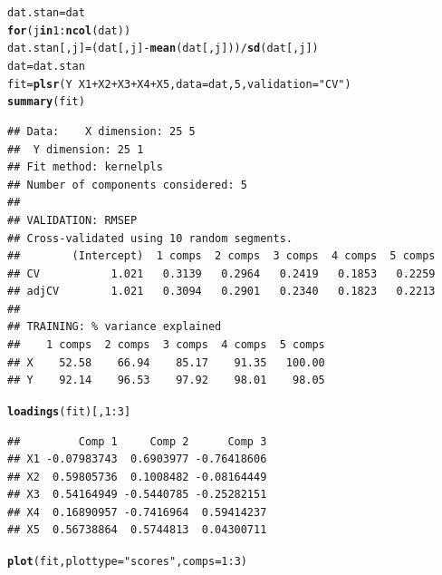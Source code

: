 \documentclass{article}\usepackage[]{graphicx}\usepackage[]{color}
\makeatletter
\newcommand{\hlnum}[1]{\textcolor[rgb]{0.686,0.059,0.569}{#1}}%
\newcommand{\hlstr}[1]{\textcolor[rgb]{0.192,0.494,0.8}{#1}}%
\newcommand{\hlopt}[1]{\textcolor[rgb]{0,0,0}{#1}}%
\newcommand{\hlstd}[1]{\textcolor[rgb]{0.345,0.345,0.345}{#1}}%
\newcommand{\hlkwa}[1]{\textcolor[rgb]{0.161,0.373,0.58}{\textbf{#1}}}%
\newcommand{\hlkwb}[1]{\textcolor[rgb]{0.69,0.353,0.396}{#1}}%
\newcommand{\hlkwc}[1]{\textcolor[rgb]{0.333,0.667,0.333}{#1}}%
\newcommand{\hlkwd}[1]{\textcolor[rgb]{0.737,0.353,0.396}{\textbf{#1}}}%
\newenvironment{kframe}{%
 \def\at@end@of@kframe{}%
 \ifinner\ifhmode%
  \def\at@end@of@kframe{\end{minipage}}%
  \begin{minipage}{\columnwidth}%
 \fi\fi%
 \def\FrameCommand##1{\hskip\@totalleftmargin \hskip-\fboxsep
 \colorbox{shadecolor}{##1}\hskip-\fboxsep
     \hskip-\linewidth \hskip-\@totalleftmargin \hskip\columnwidth}%
 \MakeFramed {\advance\hsize-\width
   \@totalleftmargin\z@ \linewidth\hsize
   \@setminipage}}%
 {\par\unskip\endMakeFramed%
 \at@end@of@kframe}
\newenvironment{knitrout}{}{} %
\makeatother
\begin{document}
\begin{enumerate}[(a)]
\begin{knitrout}
\begin{kframe}
{\ttfamily\noindent\itshape\color{messagecolor}{\#\# \\\#\# Attaching package: 'pls'\\\#\# \\\#\# The following object is masked from 'package:stats':\\\#\# \\\#\#\ \ \ \  loadings}}\begin{alltt}
  \hlstd{dat.stan} \hlkwb{=} \hlstd{dat}
  \hlkwa{for}\hlstd{(j} \hlkwa{in} \hlnum{1}\hlopt{:}\hlkwd{ncol}\hlstd{(dat))}
    \hlstd{dat.stan[,j]} \hlkwb{=} \hlstd{(dat[,j]} \hlopt{-} \hlkwd{mean}\hlstd{(dat[,j]))}\hlopt{/}\hlkwd{sd}\hlstd{(dat[,j])}
  \hlstd{dat} \hlkwb{=} \hlstd{dat.stan}
  \hlstd{fit} \hlkwb{=} \hlkwd{plsr}\hlstd{(Y} \hlopt{~} \hlstd{X1} \hlopt{+} \hlstd{X2} \hlopt{+} \hlstd{X3} \hlopt{+} \hlstd{X4} \hlopt{+} \hlstd{X5,} \hlkwc{data} \hlstd{= dat,} \hlnum{5}\hlstd{,} \hlkwc{validation}\hlstd{=}\hlstr{"CV"}\hlstd{)}
  \hlkwd{summary}\hlstd{(fit)}
\end{alltt}
\begin{verbatim}
## Data: 	X dimension: 25 5 
## 	Y dimension: 25 1
## Fit method: kernelpls
## Number of components considered: 5
## 
## VALIDATION: RMSEP
## Cross-validated using 10 random segments.
##        (Intercept)  1 comps  2 comps  3 comps  4 comps  5 comps
## CV           1.021   0.3139   0.2964   0.2419   0.1853   0.2259
## adjCV        1.021   0.3094   0.2901   0.2340   0.1823   0.2213
## 
## TRAINING: % variance explained
##    1 comps  2 comps  3 comps  4 comps  5 comps
## X    52.58    66.94    85.17    91.35   100.00
## Y    92.14    96.53    97.92    98.01    98.05
\end{verbatim}
\begin{alltt}
  \hlkwd{loadings}\hlstd{(fit)[,} \hlnum{1}\hlopt{:}\hlnum{3}\hlstd{]}
\end{alltt}
\begin{verbatim}
##         Comp 1     Comp 2      Comp 3
## X1 -0.07983743  0.6903977 -0.76418606
## X2  0.59805736  0.1008482 -0.08164449
## X3  0.54164949 -0.5440785 -0.25282151
## X4  0.16890957 -0.7416964  0.59414237
## X5  0.56738864  0.5744813  0.04300711
\end{verbatim}
\begin{alltt}
  \hlkwd{plot}\hlstd{(fit,} \hlkwc{plottype} \hlstd{=} \hlstr{"scores"}\hlstd{,} \hlkwc{comps} \hlstd{=} \hlnum{1}\hlopt{:}\hlnum{3}\hlstd{)}
\end{alltt}
\end{kframe}

\end{knitrout}
\end{enumerate}
\end{document}
